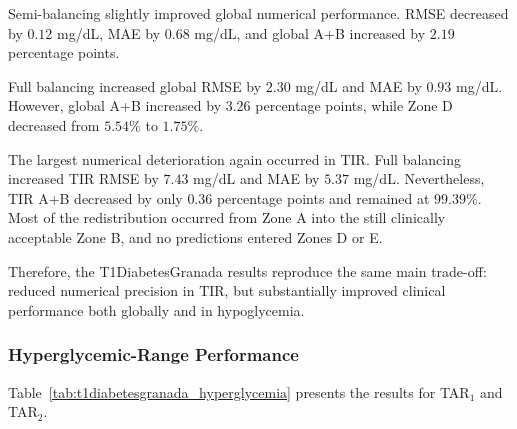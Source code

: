 Semi-balancing slightly improved global numerical performance. RMSE decreased by \(0.12\) mg/dL, MAE by \(0.68\) mg/dL, and global A+B increased by \(2.19\) percentage points.

Full balancing increased global RMSE by \(2.30\) mg/dL and MAE by \(0.93\) mg/dL. However, global A+B increased by \(3.26\) percentage points, while Zone D decreased from \(5.54\%\) to \(1.75\%\).

The largest numerical deterioration again occurred in TIR. Full balancing increased TIR RMSE by \(7.43\) mg/dL and MAE by \(5.37\) mg/dL. Nevertheless, TIR A+B decreased by only \(0.36\) percentage points and remained at \(99.39\%\). Most of the redistribution occurred from Zone A into the still clinically acceptable Zone B, and no predictions entered Zones D or E.

Therefore, the T1DiabetesGranada results reproduce the same main trade-off: reduced numerical precision in TIR, but substantially improved clinical performance both globally and in hypoglycemia.

\subsubsection{Hyperglycemic-Range Performance}
\label{subsubsec:t1diabetesgranadahyperglycemia}

Table~\ref{tab:t1diabetesgranada_hyperglycemia} presents the results for TAR$_1$ and TAR$_2$.

